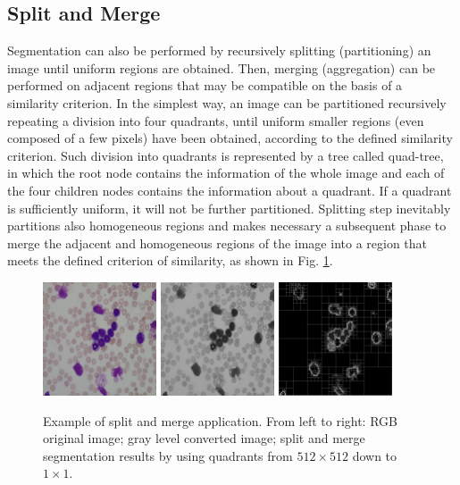 \subsection{Split and Merge} 
Segmentation can also be performed by recursively splitting (partitioning) an image until uniform regions are obtained. Then, merging (aggregation) can be performed on adjacent regions that may be compatible on the basis of a similarity criterion. In the simplest way, an image can be partitioned recursively repeating a division into four quadrants, until uniform smaller regions (even composed of a few pixels) have been obtained, according to the defined similarity criterion. Such division into quadrants is represented by a tree called quad-tree, in which the root node contains the information of the whole image and each of the four children nodes contains the information about a quadrant. If a quadrant is sufficiently uniform, it will not be further partitioned. Splitting step inevitably partitions also homogeneous regions and makes necessary a subsequent phase to merge the adjacent and homogeneous regions of the image into a region that meets the defined criterion of similarity, as shown in Fig. \ref{fig:splitMerge}.

\begin{figure}[h]
	\centering
	\includegraphics[width=0.3\textwidth]{images/fig_rgbSplitMerge0}
	\includegraphics[width=0.3\textwidth]{images/fig_rgbSplitMerge1}
	\includegraphics[width=0.3\textwidth]{images/fig_splitMerge}
	\caption[Example of split and merge.]{\label{fig:splitMerge}Example of split and merge application. From left to right: RGB original image; gray level converted image; split and merge segmentation results by using quadrants from $512 \times 512$ down to $1 \times 1$.}
\end{figure}

